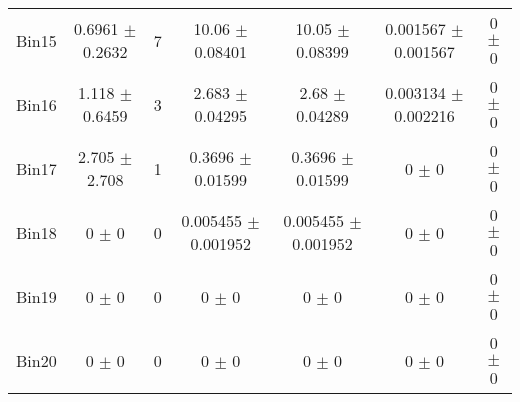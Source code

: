 \begin{tabular}{@{\extracolsep{4pt}}lcccccc@{}}
     Bin15 & 0.6961 $\pm$ 0.2632 & 7 & 10.06 $\pm$ 0.08401 & 10.05 $\pm$ 0.08399 & 0.001567 $\pm$ 0.001567 & 0 $\pm$ 0 \\ 
     Bin16 & 1.118 $\pm$ 0.6459 & 3 & 2.683 $\pm$ 0.04295 & 2.68 $\pm$ 0.04289 & 0.003134 $\pm$ 0.002216 & 0 $\pm$ 0 \\ 
     Bin17 & 2.705 $\pm$ 2.708 & 1 & 0.3696 $\pm$ 0.01599 & 0.3696 $\pm$ 0.01599 & 0 $\pm$ 0 & 0 $\pm$ 0 \\ 
     Bin18 & 0 $\pm$ 0 & 0 & 0.005455 $\pm$ 0.001952 & 0.005455 $\pm$ 0.001952 & 0 $\pm$ 0 & 0 $\pm$ 0 \\ 
     Bin19 & 0 $\pm$ 0 & 0 & 0 $\pm$ 0 & 0 $\pm$ 0 & 0 $\pm$ 0 & 0 $\pm$ 0 \\ 
     Bin20 & 0 $\pm$ 0 & 0 & 0 $\pm$ 0 & 0 $\pm$ 0 & 0 $\pm$ 0 & 0 $\pm$ 0 \\ 
\hline\hline
  \end{tabular}
